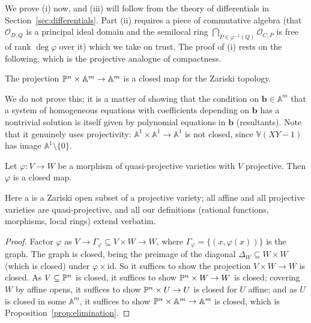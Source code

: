 \documentclass[a4paper]{scrartcl}
\newcommand{\A}{\mathbb{A}}
\newcommand{\V}{\mathbb{V}}
\newcommand{\Oh}{\mathcal{O}}
\begin{document}
We prove (i) now, and (iii) will follow from the theory of differentials in Section~\ref{sec:differentials}. Part (ii) requires a piece of commutative algebra (that $\Oh_{D,Q}$ is a principal ideal domain and the semilocal ring $\bigcap_{P \in \varphi^{-1}(Q)}\Oh_{C,P}$ is free of rank $\deg\varphi$ over it) which we take on trust. The proof of (i) rests on the following, which is the projective analogue of compactness.

\begin{proposition}\label{prop:elimination}
	The projection $\PP^n\times\A^m \to \A^m$ is a closed map for the Zariski topology.
\end{proposition}

We do not prove this; it is a matter of showing that the condition on $\mathbf b \in \A^m$ that a system of homogeneous equations with coefficients depending on $\mathbf b$ has a nontrivial solution is itself given by polynomial equations in $\mathbf b$ (resultants). Note that it genuinely uses projectivity: $\A^1 \times \A^1 \to \A^1$ is not closed, since $\V(XY - 1)$ has image $\A^1\setminus\{0\}$.

\begin{proposition}\label{prop:projclosed}
	Let $\varphi \colon V \to W$ be a morphism of quasi-projective varieties with $V$ projective. Then $\varphi$ is a closed map.
\end{proposition}

Here a  is a Zariski open subset of a projective variety; all affine and all projective varieties are quasi-projective, and all our definitions (rational functions, morphisms, local rings) extend verbatim.

\begin{proof}
	Factor $\varphi$ as $V \to \Gamma_\varphi \subseteq V\times W \to W$, where $\Gamma_\varphi = \{(x,\varphi(x))\}$ is the graph. The graph is closed, being the preimage of the diagonal $\Delta_W \subseteq W\times W$ (which is closed) under $\varphi\times\mathrm{id}$. So it suffices to show the projection $V \times W \to W$ is closed. As $V \subseteq \mathbb{P}^n$ is closed, it suffices to show $\mathbb{P}^n\times W \to W$ is closed; covering $W$ by affine opens, it suffices to show $\mathbb{P}^n\times U \to U$ is closed for $U$ affine; and as $U$ is closed in some $\A^m$, it suffices to show $\PP^n \times \A^m \to \A^m$ is closed, which is Proposition~\ref{prop:elimination}.
\end{proof}
\end{document}
